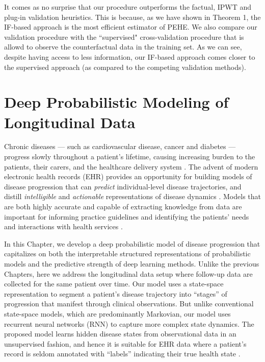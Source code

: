 \documentclass [PhD] {uclathes}
\begin{document}
It comes as no surprise that our procedure outperforms the factual, IPWT and plug-in validation heuristics. This is because, as we have shown in Theorem 1, the IF-based approach is the most efficient estimator of PEHE. We also compare our validation procedure with the ``supervised" cross-validation procedure that is allowd to observe the counterfactual data in the training set. As we can see, despite having access to less information, our IF-based approach comes closer to the supervised approach (as compared to the competing validation methods). 


\chapter{Deep Probabilistic Modeling of Longitudinal Data}

Chronic diseases --- such as cardiovascular disease, cancer and diabetes --- progress slowly throughout a patient's lifetime, causing increasing burden to the patients, their carers, and the healthcare delivery system \cite{sevick2007patients}. The advent of modern electronic health records (EHR) provides an opportunity for building models of disease progression that can \textit{predict} individual-level disease trajectories, and distill \textit{intelligible} and \textit{actionable} representations of disease dynamics \cite{blumenthal2010meaningful}. Models that are both highly accurate and capable of extracting knowledge from data are important for informing practice guidelines and identifying the patients' needs and interactions with health services \cite{topol2019high,coyne2011management,valderas2009defining}. 

In this Chapter, we develop a deep probabilistic model of disease progression that capitalizes on both the interpretable structured representations of probabilistic models and the predictive strength of deep learning methods. Unlike the previous Chapters, here we address the longitudinal data setup where follow-up data are collected for the same patient over time. Our model uses a state-space representation to segment a patient's disease trajectory into ``stages'' of progression that manifest through clinical observations. But unlike conventional state-space models, which are predominantly Markovian, our model uses recurrent neural networks (RNN) to capture more complex state dynamics. The proposed model learns hidden disease states from observational data in an unsupervised fashion, and hence it is suitable for EHR data where a patient's record is seldom annotated with ``labels'' indicating their true health state \cite{alaa2016hidden}.
\end{document}
